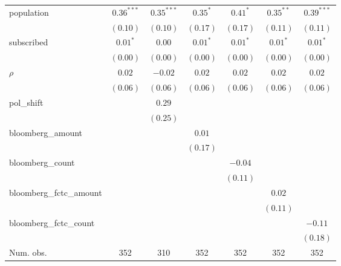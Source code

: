 \begin{table}[!h]
\begin{center}
\begin{tabular}{l c c c c c c }
population              & $0.36^{***}$ & $0.35^{***}$  & $0.35^{*}$   & $0.41^{*}$   & $0.35^{**}$  & $0.39^{***}$ \\
                        & $(0.10)$     & $(0.10)$      & $(0.17)$     & $(0.17)$     & $(0.11)$     & $(0.11)$     \\
subscribed              & $0.01^{*}$   & $0.00$        & $0.01^{*}$   & $0.01^{*}$   & $0.01^{*}$   & $0.01^{*}$   \\
                        & $(0.00)$     & $(0.00)$      & $(0.00)$     & $(0.00)$     & $(0.00)$     & $(0.00)$     \\
$\rho$                  & $0.02$       & $-0.02$       & $0.02$       & $0.02$       & $0.02$       & $0.02$       \\
                        & $(0.06)$     & $(0.06)$      & $(0.06)$     & $(0.06)$     & $(0.06)$     & $(0.06)$     \\
pol\_shift              &              & $0.29$        &              &              &              &              \\
                        &              & $(0.25)$      &              &              &              &              \\
bloomberg\_amount       &              &               & $0.01$       &              &              &              \\
                        &              &               & $(0.17)$     &              &              &              \\
bloomberg\_count        &              &               &              & $-0.04$      &              &              \\
                        &              &               &              & $(0.11)$     &              &              \\
bloomberg\_fctc\_amount &              &               &              &              & $0.02$       &              \\
                        &              &               &              &              & $(0.11)$     &              \\
bloomberg\_fctc\_count  &              &               &              &              &              & $-0.11$      \\
                        &              &               &              &              &              & $(0.18)$     \\
\midrule
Num. obs.               & 352          & 310           & 352          & 352          & 352          & 352          \\

\end{tabular}
\end{center}
\end{table}
